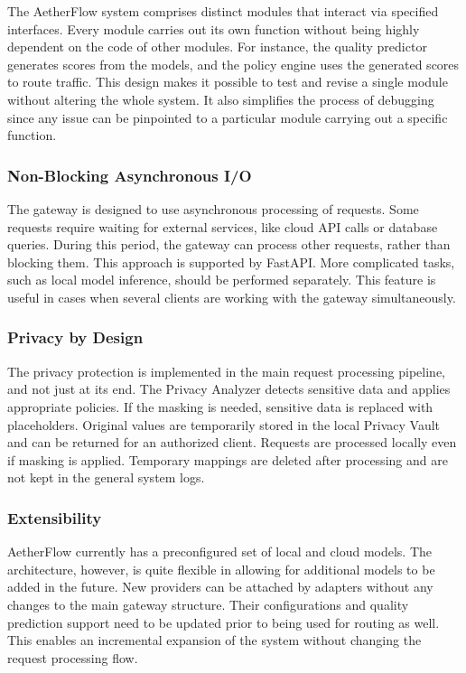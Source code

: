 \documentclass{FastFyp}
\begin{document}
The AetherFlow system comprises distinct modules that interact via specified interfaces. Every module carries out its own function without being highly dependent on the code of other modules. For instance, the quality predictor generates scores from the models, and the policy engine uses the generated scores to route traffic. This design makes it possible to test and revise a single module without altering the whole system. It also simplifies the process of debugging since any issue can be pinpointed to a particular module carrying out a specific function.

\subsubsection{Non-Blocking Asynchronous I/O}

The gateway is designed to use asynchronous processing of requests. Some requests require waiting for external services, like cloud API calls or database queries. During this period, the gateway can process other requests, rather than blocking them. This approach is supported by FastAPI. More complicated tasks, such as local model inference, should be performed separately. This feature is useful in cases when several clients are working with the gateway simultaneously.

\subsubsection{Privacy by Design}

The privacy protection is implemented in the main request processing pipeline, and not just at its end. The Privacy Analyzer detects sensitive data and applies appropriate policies. If the masking is needed, sensitive data is replaced with placeholders. Original values are temporarily stored in the local Privacy Vault and can be returned for an authorized client. Requests are processed locally even if masking is applied. Temporary mappings are deleted after processing and are not kept in the general system logs.

\subsubsection{Extensibility}

AetherFlow currently has a preconfigured set of local and cloud models. The architecture, however, is quite flexible in allowing for additional models to be added in the future. New providers can be attached by adapters without any changes to the main gateway structure. Their configurations and quality prediction support need to be updated prior to being used for routing as well. This enables an incremental expansion of the system without changing the request processing flow.
\end{document}
